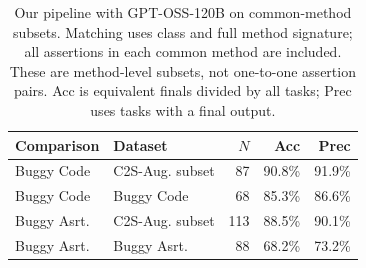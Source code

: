 \begin{table}[t]
\centering
\small
\begin{tabular}{llrrr}
\toprule
Comparison & Dataset & $N$ & Acc & Prec \\
\midrule
Buggy Code & C2S-Aug. subset & 87 & 90.8\% & 91.9\% \\
Buggy Code & Buggy Code & 68 & 85.3\% & 86.6\% \\
\midrule
Buggy Asrt. & C2S-Aug. subset & 113 & 88.5\% & 90.1\% \\
Buggy Asrt. & Buggy Asrt. & 88 & 68.2\% & 73.2\% \\
\bottomrule
\end{tabular}
\caption{Our pipeline with GPT-OSS-120B on common-method subsets. Matching uses class and full method signature; all assertions in each common method are included. These are method-level subsets, not one-to-one assertion pairs. Acc is equivalent finals divided by all tasks; Prec uses tasks with a final output.}
\label{tab:pipeline-common-method-subsets}
\end{table}
